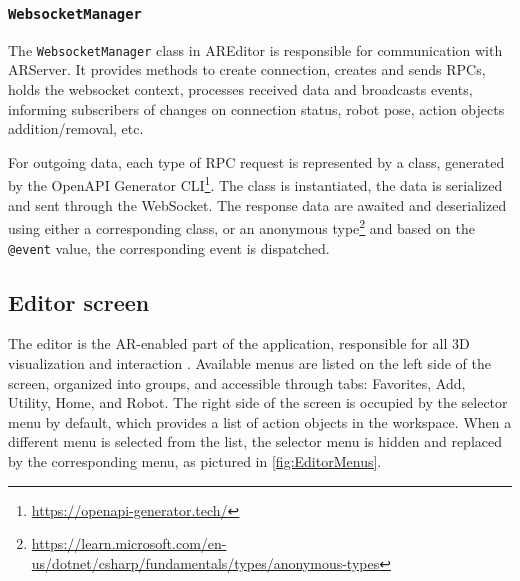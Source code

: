 \subsubsection{\texttt{WebsocketManager}}

The \texttt{WebsocketManager} class in AREditor is responsible for communication with ARServer. It provides methods to create connection, creates and sends RPCs, holds the websocket context, processes received data and broadcasts events, informing subscribers of changes on connection status, robot pose, action objects addition/removal, etc. 

For outgoing data, each type of RPC request is represented by a class, generated by the OpenAPI Generator CLI\footnote{\href{https://openapi-generator.tech/}{https://openapi-generator.tech/}}. The class is instantiated, the data is serialized and sent through the WebSocket. The response data are awaited and deserialized using either a corresponding class, or an anonymous type\footnote{\href{https://learn.microsoft.com/en-us/dotnet/csharp/fundamentals/types/anonymous-types}{https://learn.microsoft.com/en-us/dotnet/csharp/fundamentals/types/anonymous-types}} and based on the \texttt{@event} value, the corresponding event is dispatched. 

\subsection{Editor screen}
The editor is the AR-enabled part of the application, responsible for all 3D visualization and interaction . Available menus are listed on the left side of the screen, organized into groups, and accessible through tabs: Favorites, Add, Utility, Home, and Robot. The right side of the screen is occupied by the selector menu by default, which provides a list of action objects in the workspace. When a different menu is selected from the list, the selector menu is hidden and replaced by the corresponding menu, as pictured in \ref{fig:EditorMenus}. 

